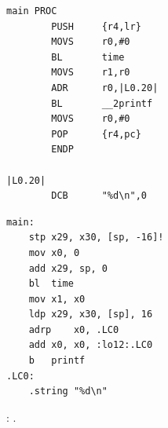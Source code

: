 \begin{lstlisting}[caption=\OptimizingKeilVI (\ThumbMode)]
main PROC
        PUSH     {r4,lr}
        MOVS     r0,#0
        BL       time
        MOVS     r1,r0
        ADR      r0,|L0.20|
        BL       __2printf
        MOVS     r0,#0
        POP      {r4,pc}
        ENDP

|L0.20|
        DCB      "%d\n",0
\end{lstlisting}

\begin{lstlisting}[caption=\Optimizing GCC 4.9 (ARM64)]
main:
	stp	x29, x30, [sp, -16]!
	mov	x0, 0
	add	x29, sp, 0
	bl	time
	mov	x1, x0
	ldp	x29, x30, [sp], 16
	adrp	x0, .LC0
	add	x0, x0, :lo12:.LC0
	b	printf
.LC0:
	.string	"%d\n"
\end{lstlisting}



\Answer{}: .

